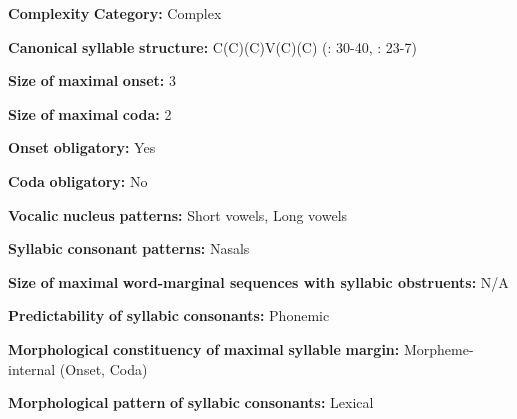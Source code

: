 \documentclass[output=paper]{langsci/langscibook}
\begin{document}
\begin{styleBody}
\textbf{Complexity} \textbf{Category:} Complex
\end{styleBody}

\begin{styleBody}
\textbf{Canonical} \textbf{syllable} \textbf{structure:} C(C)(C)V(C)(C) (\citealt{Olsen2014}: 30-40, \citealt{Manley1972}: 23-7)
\end{styleBody}

\begin{styleBody}
\textbf{Size} \textbf{of} \textbf{maximal} \textbf{onset:} 3
\end{styleBody}

\begin{styleBody}
\textbf{Size} \textbf{of} \textbf{maximal} \textbf{coda:} 2
\end{styleBody}

\begin{styleBody}
\textbf{Onset} \textbf{obligatory:} Yes
\end{styleBody}

\begin{styleBody}
\textbf{Coda} \textbf{obligatory:} No
\end{styleBody}

\begin{styleBody}
\textbf{Vocalic} \textbf{nucleus} \textbf{patterns:} Short vowels, Long vowels
\end{styleBody}

\begin{styleBody}
\textbf{Syllabic} \textbf{consonant} \textbf{patterns:} Nasals
\end{styleBody}

\begin{styleBody}
\textbf{Size} \textbf{of} \textbf{maximal} \textbf{word{}-marginal sequences with syllabic obstruents:} N/A
\end{styleBody}

\begin{styleBody}
\textbf{Predictability} \textbf{of} \textbf{syllabic} \textbf{consonants:} Phonemic
\end{styleBody}

\begin{styleBody}
\textbf{Morphological} \textbf{constituency} \textbf{of} \textbf{maximal} \textbf{syllable} \textbf{margin:} Morpheme-internal (Onset, Coda)
\end{styleBody}

\begin{styleBody}
\textbf{Morphological} \textbf{pattern} \textbf{of} \textbf{syllabic} \textbf{consonants:} Lexical
\end{styleBody}
\end{document}
